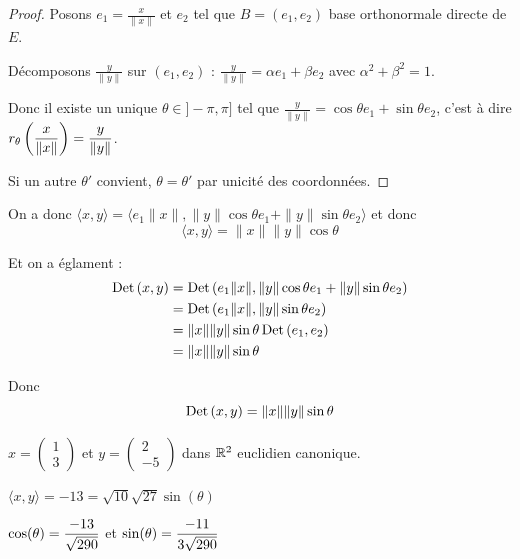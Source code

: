 
\begin{proof}
    Posons $e_1 = \frac x {\| x \|}$ et $e_2$ tel que $B = (e_1, e_2)$ base orthonormale directe de $E$.

    Décomposons $\frac y {\| y \|}$ sur $(e_1, e_2)$ : 
    $\frac y {\| y \|} = \alpha e_1 + \beta e_2$ avec $\alpha^2 + \beta^2 = 1$.

    Donc il existe un unique $\theta \in ]- \pi, \pi]$ tel que $\frac y {\| y \|} = \cos \theta e_1 + \sin \theta e_2$, 
    c'est à dire $\displaystyle r_\theta\left( \frac x {\| x \|} \right) = \frac y {\| y \|}$.

    Si un autre $\theta'$ convient, $\theta = \theta'$ par unicité des coordonnées. 
\end{proof}

On a donc $\langle x, y \rangle = \langle e_1 \| x \|, \| y \| \cos \theta e_1 + \| y \| \sin \theta e_2 \rangle$
et donc 
$$\langle x, y \rangle = \| x \| \| y \| \cos \theta$$

Et on a églament : 
\begin{align}
    \operatorname{Det} \,(x, y) & = \operatorname{Det} \,(e_1 \| x \|, \| y \| \cos \theta e_1 + \| y \| \sin \theta e_2) \\
    & = \operatorname{Det} \,(e_1 \| x \|, \| y \| \sin \theta e_2) \\
    & = \| x \| \| y \| \sin \theta \operatorname{Det} \,(e_1, e_2) \\
    & = \| x \| \| y \| \sin \theta
\end{align}

Donc 
$$\operatorname{Det} \,(x, y) = \| x \| \| y \| \sin \theta$$

\begin{exemple}
    $x = \begin{pmatrix}
        1 \\ 3
    \end{pmatrix}$ et $y = \begin{pmatrix}
        2 \\ -5
    \end{pmatrix}$ dans $\mathbb{R}^2$ euclidien canonique.

    $\langle x, y \rangle = -13 = \sqrt {10} \sqrt{27} \sin(\theta)$

    $\displaystyle \cos(\theta) = \frac{- 13}{\sqrt{290}}$ et $\displaystyle \sin(\theta) = \frac{- 11}{3\sqrt{290}}$
\end{exemple}

